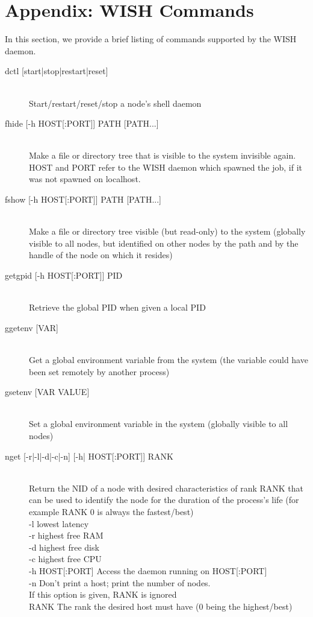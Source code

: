 \appendix \section{Appendix: WISH Commands} \label{sec:appendix}

In this section, we provide a brief listing of commands supported by the WISH
daemon.

\begin{description}

\item[dctl [start|stop|restart|reset{]}]\hfill \\
 Start/restart/reset/stop a node's shell daemon

\item[fhide [-h HOST[:PORT{]}{]} PATH [PATH...{]}]\hfill \\
 Make a file or directory tree that is visible to the system invisible again.
HOST and PORT refer to the WISH daemon which spawned the job, if it was not
spawned on localhost.

\item[fshow [-h HOST[:PORT{]}{]} PATH [PATH...{]}]\hfill \\
Make a file or directory tree visible (but read-only) to
the system (globally visible to all nodes, but identified on other nodes by the
path and by the handle of the node on which it resides)

\item[getgpid [-h HOST[:PORT{]}{]} PID] \hfill \\
Retrieve the global PID when given a local PID

\item[ggetenv [VAR{]}]\hfill \\
Get a global environment variable from the system (the
variable could have been set remotely by another process)

\item[gsetenv [VAR VALUE{]}]\hfill \\
Set a global environment variable in the system
(globally visible to all nodes)

\item[nget [-r|-l|-d|-c|-n{]} [-h| HOST[:PORT{]}{]} RANK]\hfill \\
Return the NID of a node with desired characteristics of rank RANK that can be used to
identify the node for
the duration of the process's life (for example RANK 0 is always the
fastest/best)\\  
	-l            lowest latency \\
   -r             highest free RAM \\
   -d             highest free disk \\
   -c             highest free CPU \\
   -h HOST[:PORT] Access the daemon running on HOST[:PORT] \\
   -n             Don't print a host; print the number of nodes. \\
                  If this option is given, RANK is ignored \\
   RANK           The rank the desired host must have (0 being the highest/best) \\


\end{description}
